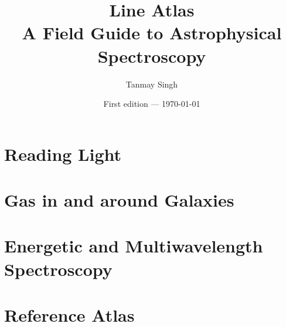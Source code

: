\documentclass[11pt,oneside,openany]{book}
\title{\textbf{Line Atlas}\\[0.5em]\Large A Field Guide to Astrophysical Spectroscopy}
\author{Tanmay Singh}
\date{First edition --- \today}
\begin{document}
\hypersetup{pageanchor=false}

\hypersetup{pageanchor=true}
\frontmatter

\tableofcontents
\listoffigures
\listoftables

\mainmatter
\part{Reading Light}




\part{Gas in and around Galaxies}







\part{Energetic and Multiwavelength Spectroscopy}





\part{Reference Atlas}


\appendix




\backmatter


\printindex
\end{document}
